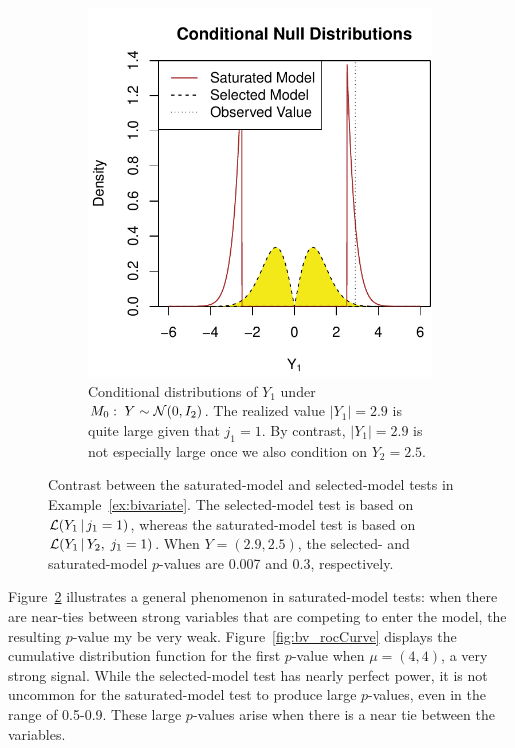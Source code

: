 \documentclass{article}
\begin{document}
\begin{figure}
\begin{subfigure}[t]{.4\textwidth}
    \includegraphics[width=\textwidth]{figs/bivariateSelVSat_nullDists.pdf}
    \caption{Conditional distributions of $Y_1$ under
      $M_0:\; Y \sim \mathcal{N}(0,I_2)$. The realized value $|Y_1|=2.9$ is
      quite large given that $j_1=1$. By
      contrast, $|Y_1|=2.9$ is not especially large once we 
      also condition on $Y_2=2.5$.}
  \label{fig:bv_nullDists}
  \end{subfigure}
  \caption{Contrast between the saturated-model and selected-model
    tests in Example~\ref{ex:bivariate}. The selected-model test is based on  $\mathcal{L}(Y_1 \,|\, j_1=1)$,  whereas the saturated-model test is based on $\mathcal{L}(Y_1  \,|\, Y_2, \; j_1=1)$. 
    When $Y=(2.9, 2.5)$, the selected- and saturated-model $p$-values are 0.007 and 0.3, respectively.}
  \label{fig:bv}
\end{figure}

Figure~\ref{fig:bv} illustrates a general phenomenon in saturated-model tests: when there are near-ties between strong variables that are competing to enter the model, the resulting $p$-value my be very weak. Figure~\ref{fig:bv_rocCurve} displays the cumulative distribution function for the first $p$-value when $\mu=(4,4)$, a very strong signal. While the selected-model test has nearly perfect power, it is not uncommon for the saturated-model test to produce large $p$-values, even in the range of 0.5-0.9. These large $p$-values arise when there is a near tie between the variables.
\end{document}
